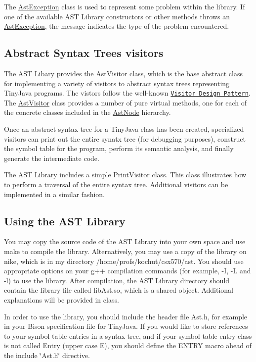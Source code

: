 The \hyperlink{classAstException}{AstException} class is used to represent some problem within the library. If one of the available AST Library constructors or other methods throws an \hyperlink{classAstException}{AstException}, the message indicates the type of the problem encountered.\hypertarget{main_VISITORS}{}\subsection{Abstract Syntax Trees visitors}\label{main_VISITORS}
The AST Libary provides the \hyperlink{classAstVisitor}{AstVisitor} class, which is the base abstract class for implementing a variety of visitors to abstract syntax trees representing TinyJava programs. The vistors follow the well-\/known \href{http://sourcemaking.com/design_patterns/visitor}{\tt Visitor Design Pattern}. The \hyperlink{classAstVisitor}{AstVisitor} class provides a number of pure virtual methods, one for each of the concrete classes included in the \hyperlink{classAstNode}{AstNode} hierarchy.

Once an abstract syntax tree for a TinyJava class has been created, specialized visitors can print out the entire synatx tree (for debugging purposes), construct the symbol table for the program, perform its semantic analysis, and finally generate the intermediate code.

The AST Library includes a simple PrintVisitor class. This class illustrates how to perform a traversal of the entire syntax tree. Additional visitors can be implemented in a similar fashion.\hypertarget{main_USING}{}\subsection{Using the AST Library}\label{main_USING}
You may copy the source code of the AST Library into your own space and use make to compile the library. Alternatively, you may use a copy of the library on nike, which is in my directory /home/profs/kochut/csx570/ast. You should use appropriate options on your g++ compilation commands (for example, -\/I, -\/L and -\/l) to use the library. After compilation, the AST Library directory should contain the library file called libAst.so, which is a shared object. Additional explanations will be provided in class.

In order to use the library, you should include the header file Ast.h, for example in your Bison specification file for TinyJava. If you would like to store references to your symbol table entries in a syntax tree, and if your symbol table entry class is not called Entry (upper case E), you should define the ENTRY macro ahead of the include \char`\"{}Ast.h\char`\"{} directive. 